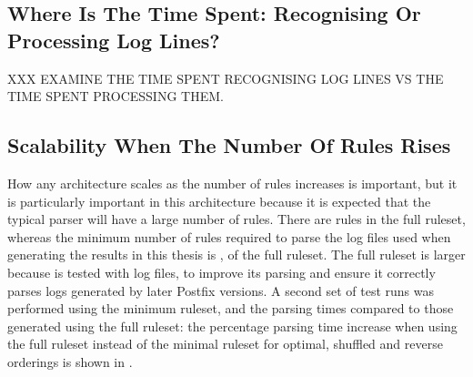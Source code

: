 

\FloatBarrier{}

\subsection{Where Is The Time Spent: Recognising Or Processing Log Lines?}

\label{recognising vs processing}

XXX EXAMINE THE TIME SPENT RECOGNISING LOG LINES VS THE TIME SPENT
PROCESSING THEM\@.

\subsection{Scalability When The Number Of Rules Rises}

\label{scalability as the number of rules rises}

How any architecture scales as the number of rules increases is important,
but it is particularly important in this architecture because it is
expected that the typical parser will have a large number of rules.  There
are \numberOFrules{} rules in the full \parsername{} ruleset, whereas the minimum
number of rules required to parse the \numberOFlogFILES{} log files used
when generating the results in this thesis is \numberOFrulesMINIMUM{},
\numberOFrulesMINIMUMpercentage{} of the full ruleset.  The full ruleset is
larger because \parsername{} is tested with \numberOFlogFILESall{} log
files, to improve its parsing and ensure it correctly parses logs generated
by later Postfix versions.  A second set of test runs was performed using
the minimum ruleset, and the parsing times compared to those generated
using the full ruleset: the percentage parsing time increase when using the
full ruleset instead of the minimal ruleset for optimal, shuffled and
reverse orderings is shown in .


